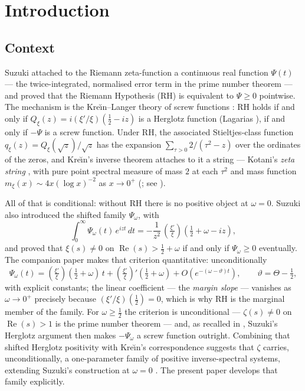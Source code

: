 \documentclass[11pt,reqno]{amsart}
\theoremstyle{plain}
\theoremstyle{definition}
\newcommand{\Rp}{\operatorname{Re}}
\newcommand{\lxi}[1]{\left(\tfrac{\xi'}{\xi}\right)\!#1}
\begin{document}
\section{Introduction}\label{sec:intro}

\subsection{Context}
Suzuki \cite{Suzuki2023} attached to the Riemann zeta-function a continuous real function
$\Psi(t)$ --- the twice-integrated, normalised error term in the prime number theorem --- and
proved that the Riemann Hypothesis (RH) is equivalent to $\Psi\ge0$ pointwise. The mechanism is
the Kre\u\i n--Langer theory of screw functions \cite{KreinLanger}: RH holds if and only if
$Q_\xi(z)=i(\xi'/\xi)(\tfrac12-iz)$ is a Herglotz function (Lagarias \cite{Lagarias1999}), if
and only if $-\Psi$ is a screw function. Under RH, the associated Stieltjes-class function
$q_\xi(z)=Q_\xi(\sqrt z)/\sqrt z$ has the expansion $\sum_{\tau>0}2/(\tau^2-z)$ over the
ordinates of the zeros, and Kre\u\i n's inverse theorem \cite{Krein1952} attaches to it a
string --- Kotani's \emph{zeta string} \cite{Kotani}, with pure point spectral measure of mass
$2$ at each $\tau^2$ and mass function $m_\xi(x)\sim4x(\log x)^{-2}$ as $x\to0^+$
(\cite{Kotani}; see \cite[\S9]{Suzuki2023}).

All of that is conditional: without RH there is no positive object at $\omega=0$. Suzuki also
introduced \cite[\S11]{Suzuki2023} the shifted family $\Psi_\omega$, with
\begin{equation}\label{eq:laplace}
  \int_0^\infty\Psi_\omega(t)\,e^{izt}\,dt
  =-\frac1{z^2}\,\lxi{\left(\tfrac12+\omega-iz\right)},
\end{equation}
and proved that $\xi(s)\neq0$ on $\Rp(s)>\tfrac12+\omega$ if and only if $\Psi_\omega\ge0$
eventually. The companion paper \cite{Margin} makes that criterion quantitative:
unconditionally
\begin{equation}\label{eq:margin}
  \Psi_\omega(t)=\lxi{\left(\tfrac12+\omega\right)}\,t+\lxi{'\left(\tfrac12+\omega\right)}
  +O\!\left(e^{-(\omega-\vartheta)t}\right),\qquad \vartheta=\Theta-\tfrac12,
\end{equation}
with explicit constants; the linear coefficient --- the \emph{margin slope} --- vanishes as
$\omega\to0^+$ precisely because $(\xi'/\xi)(\tfrac12)=0$, which is why RH is the marginal
member of the family. For $\omega\ge\tfrac12$ the criterion is unconditional ---
$\zeta(s)\neq0$ on $\Rp(s)>1$ is the prime number theorem --- and, as recalled in
\cite{Margin}, Suzuki's Herglotz argument then makes $-\Psi_\omega$ a screw function outright.
Combining that shifted Herglotz positivity with Kre\u\i n's correspondence suggests that
$\zeta$ carries, unconditionally, a one-parameter family of positive inverse-spectral systems,
extending Suzuki's construction at $\omega=0$ \cite[\S9]{Suzuki2023}. The present paper
develops that family explicitly.
\end{document}
